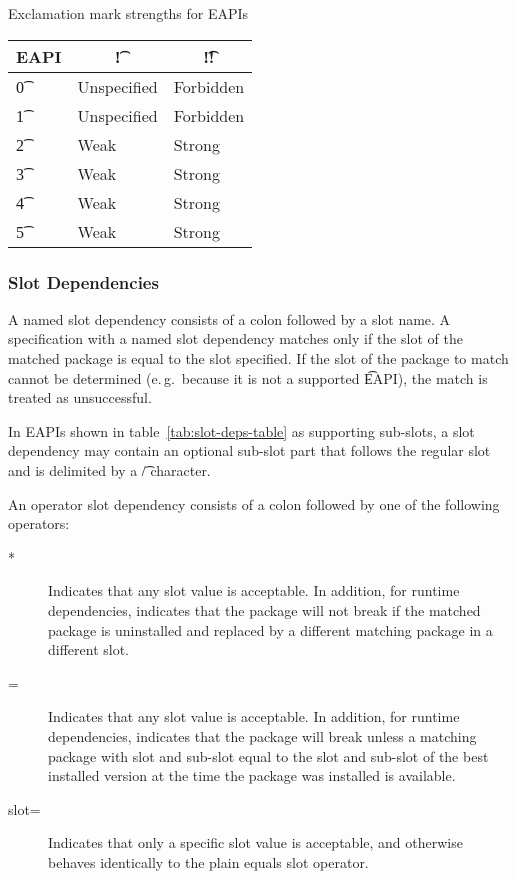 \begin{centertable}{Exclamation mark strengths for EAPIs} \label{tab:bang-strength-table}
    \begin{tabular}{ l l l }
        \toprule
            \multicolumn{1}{c}{\textbf{EAPI}} &
            \multicolumn{1}{c}{\textbf{\t{!}}} &
            \multicolumn{1}{c}{\textbf{\t{!!}}} \\
            \midrule
    \t{0} & Unspecified & Forbidden \\
    \t{1} & Unspecified & Forbidden \\
    \t{2} & Weak & Strong \\
    \t{3} & Weak & Strong \\
    \t{4} & Weak & Strong \\
    \t{5} & Weak & Strong \\
    \bottomrule
    \end{tabular}
\end{centertable}

\subsubsection{Slot Dependencies}
\label{sec:slot-dep}

 A named slot dependency consists of a colon followed by a slot name. A
specification with a named slot dependency matches only if the slot of the matched package is equal
to the slot specified. If the slot of the package to match cannot be determined (e.\,g.\ because it
is not a supported \t{EAPI}), the match is treated as unsuccessful.

 In EAPIs shown in table~\ref{tab:slot-deps-table} as supporting sub-slots,
a slot dependency may contain an optional sub-slot part that follows the regular slot and is
delimited by a \t{/} character.

 An operator slot dependency consists of a colon followed by one of
the following operators:

\begin{description}
\item[*] Indicates that any slot value is acceptable. In addition, for runtime dependencies,
indicates that the package will not break if the matched package is uninstalled and replaced by
a different matching package in a different slot.
\item[=] Indicates that any slot value is acceptable. In addition, for runtime dependencies,
indicates that the package will break unless a matching package with slot and sub-slot equal to the
slot and sub-slot of the best installed version at the time the package was installed is available.
\item[slot=] Indicates that only a specific slot value is acceptable, and otherwise behaves
identically to the plain equals slot operator.
\end{description}

